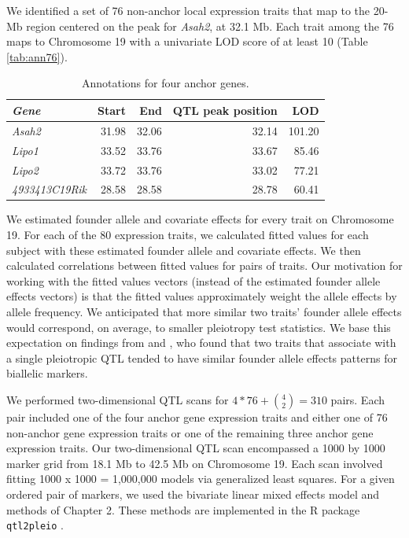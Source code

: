 \documentclass[oneside]{book}\usepackage[]{graphicx}\usepackage[]{color}
\begin{document}
We identified a set of 76 non-anchor local expression traits that map to the 20-Mb region centered on the peak for \emph{Asah2}, at 32.1 Mb. Each trait among the 76 maps to Chromosome 19 with a univariate LOD score of at least 10 (Table \ref{tab:ann76}).


\begin{table}[ht]
\caption{Annotations for four anchor genes.}\label{tab:ann4}
\centering
\begin{tabular}{>{\em}lrrrr}
  \hline
Gene & Start & End & QTL peak position & LOD \\
  \hline
Asah2 & 31.98 & 32.06 & 32.14 & 101.20 \\
  Lipo1 & 33.52 & 33.76 & 33.67 & 85.46 \\
  Lipo2 & 33.72 & 33.76 & 33.02 & 77.21 \\
  4933413C19Rik & 28.58 & 28.58 & 28.78 & 60.41 \\
   \hline
\end{tabular}
\end{table}







We estimated founder allele and covariate effects for every trait on Chromosome 19. 
For each of the 80 expression traits, we calculated fitted values for each subject with these estimated founder allele and covariate effects. 
We then calculated correlations between fitted values for pairs of traits. 
Our motivation for working with the fitted values vectors 
(instead of the estimated founder allele effects vectors) is that the fitted values approximately weight the allele effects by allele frequency. 
We anticipated that more similar two traits' founder allele effects would correspond, on average, to smaller pleiotropy test statistics. 
We base this expectation on findings from \citet{macdonald2007joint} and 
\citet{king2012genetic}, who found that two traits that associate with a single 
pleiotropic QTL tended to have similar founder allele effects patterns for biallelic markers. 


We performed two-dimensional QTL scans for $4 * 76 + \binom{4}{2} = 310$ pairs. 
Each pair included one of the four anchor gene expression traits and 
either one of 76 non-anchor gene expression traits or one of 
the remaining three anchor gene expression traits.
Our two-dimensional QTL scan encompassed a 1000 by 1000 marker grid from 18.1 Mb to 42.5 Mb on Chromosome 19. 
Each scan involved fitting 1000 x 1000 = 1,000,000 models via generalized least squares. 
For a given ordered pair of markers, we used the bivariate linear mixed effects model and methods of Chapter 2. 
These methods are implemented in the R package \texttt{qtl2pleio} \citep{qtl2pleio}.
\end{document}
